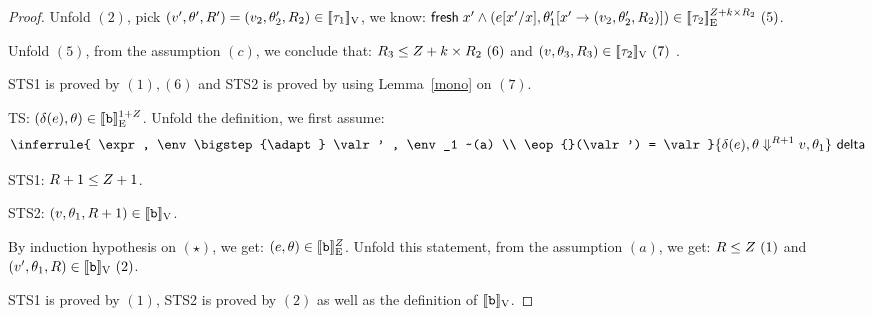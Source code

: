 \begin{proof}
Unfold $(2)$, pick $(\valr', \env', R') = (\valr_2, \env_2', \adapt_2) \in \lrv{\type_1} $,  we know: $ \fresh \eapp x' \land  (  \expr[x'/x], \env_1'[ x'  \to (\valr_2, \env_2', \adapt_2  ) ]  ) \in \lre{}{\nnatA+\idx\times R_2 }{\type_2} ~(5) $.

Unfold $(5)$, from the assumption $(c)$, we conclude that: $ \adapt_3 \leq \nnatA+\idx\times R_2~(6)$ and $(\valr, \env_3, \adapt_3) \in \lrv{\type_2} ~(7) $ .

STS1 is proved by $(1), (6)$ and STS2 is proved by using Lemma~\ref{mono} on $(7)$. \\


 TS: $(\delta(\expr), \env ) \in  \lre{}{ 1+ \nnatA}{ \tbase }$.
 Unfold the definition, we first assume:
 \[ \inferrule{
    \expr , \env \bigstep{\adapt} \valr' , \env_1 ~(a) \\
    \eop{}(\valr') = \valr
  }{
    \eop(\expr), \env \bigstep{\adapt +1} \valr,  \env_1
  }~\textsf{delta}
  \]

  STS1: $\adapt+1 \leq \nnatA +1$.
  
STS2: $ (\valr, \env_1, \adapt+1) \in \lrv{\tbase} $.

By induction hypothesis on $(\star)$, we get: $ (\expr, \env) \in \lre{}{\nnatA}{\tbase} $.
Unfold this statement, from the assumption $(a)$, we get: $ \adapt \leq \nnatA~(1) $ and $ (\valr', \env_1, \adapt)  \in \lrv{\tbase}~(2)$.

STS1 is proved by $(1)$,  STS2 is proved by $(2)$ as well as the definition of $\lrv{\tbase}$.





 \end{proof} 